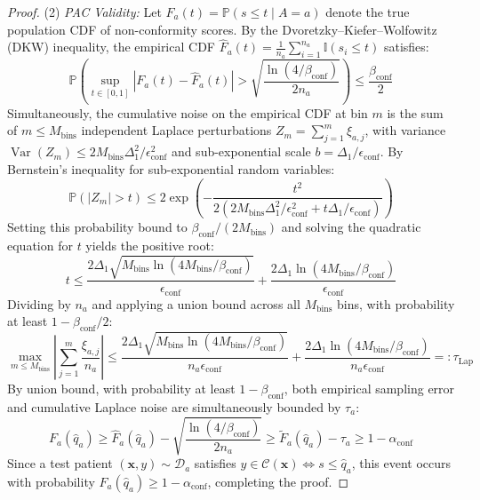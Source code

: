 \documentclass[pdflatex,sn-vancouver-num,referee,lineno]{sn-jnl}
\theoremstyle{thmstyleone}
\theoremstyle{thmstylethree}
\begin{document}
\begin{proof}
(2) \emph{PAC Validity:} Let $F_a(t) = \mathbb{P}(s \le t \mid A=a)$ denote the true population CDF of non-conformity scores. By the Dvoretzky--Kiefer--Wolfowitz (DKW) inequality, the empirical CDF $\hat{F}_a(t) = \frac{1}{n_a} \sum_{i=1}^{n_a} \mathbb{I}(s_i \le t)$ satisfies:
\begin{equation}
    \mathbb{P}\left(\sup_{t \in [0, 1]} |F_a(t) - \hat{F}_a(t)| > \sqrt{\frac{\ln(4/\beta_{\text{conf}})}{2 n_a}}\right) \le \frac{\beta_{\text{conf}}}{2}
\end{equation}
Simultaneously, the cumulative noise on the empirical CDF at bin $m$ is the sum of $m \le M_{\text{bins}}$ independent Laplace perturbations $Z_m = \sum_{j=1}^m \xi_{a, j}$, with variance $\operatorname{Var}(Z_m) \le 2 M_{\text{bins}} \Delta_1^2 / \epsilon_{\text{conf}}^2$ and sub-exponential scale $b = \Delta_1/\epsilon_{\text{conf}}$. By Bernstein's inequality for sub-exponential random variables:
\begin{equation}
    \mathbb{P}\left(|Z_m| > t\right) \le 2 \exp\left( - \frac{t^2}{2 (2 M_{\text{bins}} \Delta_1^2 / \epsilon_{\text{conf}}^2 + t \Delta_1 / \epsilon_{\text{conf}})} \right)
\end{equation}
Setting this probability bound to $\beta_{\text{conf}} / (2 M_{\text{bins}})$ and solving the quadratic equation for $t$ yields the positive root:
\begin{equation}
    t \le \frac{2 \Delta_1 \sqrt{M_{\text{bins}} \ln(4M_{\text{bins}}/\beta_{\text{conf}})}}{\epsilon_{\text{conf}}} + \frac{2 \Delta_1 \ln(4M_{\text{bins}}/\beta_{\text{conf}})}{\epsilon_{\text{conf}}}
\end{equation}
Dividing by $n_a$ and applying a union bound across all $M_{\text{bins}}$ bins, with probability at least $1 - \beta_{\text{conf}}/2$:
\begin{equation}
    \max_{m \le M_{\text{bins}}} \left| \sum_{j=1}^m \frac{\xi_{a, j}}{n_a} \right| \le \frac{2 \Delta_1 \sqrt{M_{\text{bins}} \ln(4M_{\text{bins}}/\beta_{\text{conf}})}}{n_a \epsilon_{\text{conf}}} + \frac{2 \Delta_1 \ln(4M_{\text{bins}}/\beta_{\text{conf}})}{n_a \epsilon_{\text{conf}}} =: \tau_{\text{Lap}}
\end{equation}
By union bound, with probability at least $1 - \beta_{\text{conf}}$, both empirical sampling error and cumulative Laplace noise are simultaneously bounded by $\tau_a$:
\begin{equation}
    F_a(\hat{q}_a) \ge \hat{F}_a(\hat{q}_a) - \sqrt{\frac{\ln(4/\beta_{\text{conf}})}{2 n_a}} \ge \widetilde{F}_a(\hat{q}_a) - \tau_a \ge 1 - \alpha_{\text{conf}}
\end{equation}
Since a test patient $(\mathbf{x}, y) \sim \mathcal{D}_a$ satisfies $y \in \mathcal{C}(\mathbf{x}) \iff s \le \hat{q}_a$, this event occurs with probability $F_a(\hat{q}_a) \ge 1 - \alpha_{\text{conf}}$, completing the proof.
\end{proof}
\end{document}
